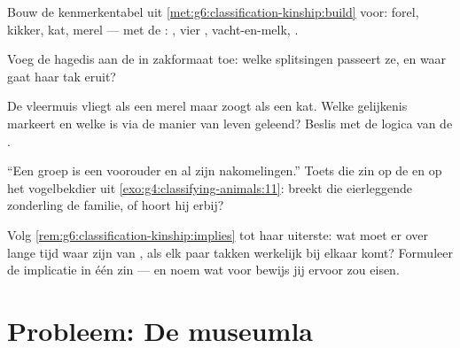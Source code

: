 \begin{exercise}[$\star\star$]\label{exo:g6:classification-kinship:8}
Bouw de kenmerkentabel uit \cref{met:g6:classification-kinship:build}
voor: forel, kikker, kat, merel --- met de : , vier
, vacht-en-melk, .
\end{exercise}

\begin{exercise}[$\star\star$]\label{exo:g6:classification-kinship:9}
Voeg de hagedis aan de  in zakformaat toe: welke splitsingen
passeert ze, en waar gaat haar tak eruit?
\end{exercise}

\begin{exercise}[$\star\star$]\label{exo:g6:classification-kinship:10}
De vleermuis vliegt als een merel maar zoogt als een kat. Welke
gelijkenis markeert  en welke is via de manier van leven
geleend? Beslis met de logica van de .
\end{exercise}

\begin{exercise}[$\star\star$]\label{exo:g6:classification-kinship:11}
``Een groep is een voorouder en al zijn nakomelingen.'' Toets die zin op
de  en op het vogelbekdier uit
\cref{exo:g4:classifying-animals:11}: breekt die eierleggende
zonderling de familie, of hoort hij erbij?
\end{exercise}

\begin{exercise}[$\star\star\star$]\label{exo:g6:classification-kinship:12}
Volg \cref{rem:g6:classification-kinship:implies} tot haar uiterste: wat
moet er over lange tijd waar zijn van , als elk paar takken
werkelijk bij elkaar komt? Formuleer de implicatie in één zin --- en noem
wat voor bewijs jij ervoor zou eisen.
\end{exercise}

\section{Probleem: De museumla}


